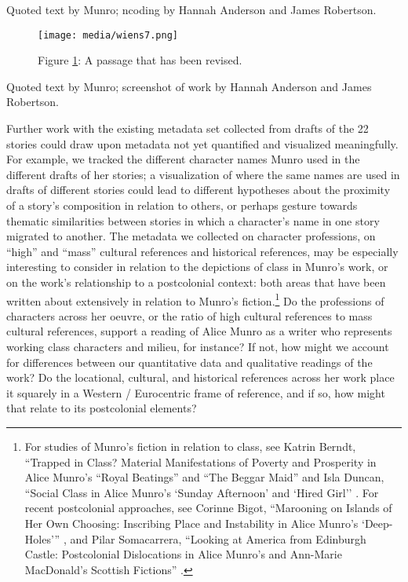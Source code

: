 \documentclass{article}
\begin{document}
Quoted text by Munro; ncoding by Hannah Anderson and James Robertson.

\begin{figure}[t]
    \centering
    \texttt{[image: media/wiens7.png]}
    \caption{Figure \ref{fig:wiens7}: A passage that has been revised.}
    \label{fig:wiens7}
\end{figure}

Quoted text by Munro; screenshot of work by Hannah Anderson and James Robertson.



Further work with the existing metadata set collected from drafts of the
22 stories could draw upon metadata not yet quantified and visualized
meaningfully. For example, we tracked the different character names
Munro used in the different drafts of her stories; a visualization of
where the same names are used in drafts of different stories could lead
to different hypotheses about the proximity of a story's composition in
relation to others, or perhaps gesture towards thematic similarities
between stories in which a character's name in one story migrated to
another. The metadata we collected on character professions, on ``high''
and ``mass'' cultural references and historical references, may be
especially interesting to consider in relation to the depictions of
class in Munro's work, or on the work's relationship to a postcolonial
context: both areas that have been written about extensively in relation
to Munro's fiction.\footnote{For studies of Munro's fiction in relation
  to class, see Katrin Berndt, ``Trapped in Class? Material
  Manifestations of Poverty and Prosperity in Alice Munro's ``Royal
  Beatings'' and ``The Beggar Maid'' \citep{berndt_trapped_2020} and Isla Duncan, ``Social Class in Alice Munro's `Sunday
  Afternoon' and `Hired Girl'' \citep{duncan_social_2009}. For recent postcolonial
  approaches, see Corinne Bigot, ``Marooning on Islands of Her Own
  Choosing: Inscribing Place and Instability in Alice Munro's
  `Deep-Holes''' \citep{bigot_marooning_2020}, and Pilar Somacarrera, ``Looking at America from
  Edinburgh Castle: Postcolonial Dislocations in Alice Munro's and
  Ann-Marie MacDonald's Scottish Fictions'' \citep{somacarrera_looking_2016}.} Do the professions of
characters across her oeuvre, or the ratio of high cultural references
to mass cultural references, support a reading of Alice Munro as a
writer who represents working class characters and milieu, for instance?
If not, how might we account for differences between our quantitative
data and qualitative readings of the work? Do the locational, cultural,
and historical references across her work place it squarely in a Western
/ Eurocentric frame of reference, and if so, how might that relate to
its postcolonial elements?
\end{document}
